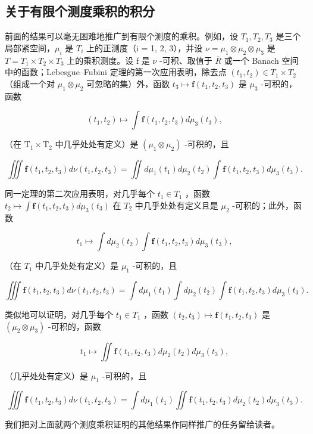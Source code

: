 \subsection{关于有限个测度乘积的积分}

前面的结果可以毫无困难地推广到有限个测度的乘积。例如，设 \(T_{1}, T_{2}, T_{3}\) 是三个局部紧空间，\(\mu_{i}\) 是 \(T_{i}\) 上的正测度（i = 1, 2, 3），并设 \(\nu = \mu_{1} \otimes \mu_{2} \otimes \mu_{3}\) 是 \(T = T_{1} \times T_{2} \times T_{3}\) 上的乘积测度。设 f 是 \(\nu\) -可积、取值于 \(\overline{R}\) 或一个 Banach 空间中的函数；Lebesgue--Fubini 定理的第一次应用表明，除去点 \((t_{1}, t_{2}) \in T_{1} \times T_{2}\) （组成一个对 \(\mu_{1} \otimes \mu_{2}\) 可忽略的集）外，函数 \(t_{3} \mapsto \mathbf{f}(t_{1}, t_{2}, t_{3})\) 是 \(\mu_{3}\) -可积的，函数

\[
(t _ {1}, t _ {2}) \mapsto \int \mathbf {f} (t _ {1}, t _ {2}, t _ {3}) d \mu_ {3} (t _ {3}),
\]

（在 \(\mathrm{T}_1\times \mathrm{T}_2\) 中几乎处处有定义）是 \((\mu_{1}\otimes \mu_{2})\) -可积的，且

\[
\iiint \mathbf {f} (t _ {1}, t _ {2}, t _ {3}) d \nu (t _ {1}, t _ {2}, t _ {3}) = \iint d \mu_ {1} (t _ {1}) d \mu_ {2} (t _ {2}) \int \mathbf {f} (t _ {1}, t _ {2}, t _ {3}) d \mu_ {3} (t _ {3}).
\]

同一定理的第二次应用表明，对几乎每个 \(t_{1} \in T_{1}\) ，函数 \(t_{2} \mapsto \int \mathbf{f}(t_{1}, t_{2}, t_{3}) d\mu_{3}(t_{3})\) 在 \(T_{2}\) 中几乎处处有定义且是 \(\mu_{2}\) -可积的；此外，函数

\[
t _ {1} \mapsto \int d \mu_ {2} (t _ {2}) \int \mathbf {f} (t _ {1}, t _ {2}, t _ {3}) d \mu_ {3} (t _ {3}),
\]

（在 \(T_{1}\) 中几乎处处有定义）是 \(\mu_{1}\) -可积的，且

\[
\iiint \mathbf {f} (t _ {1}, t _ {2}, t _ {3}) d \nu (t _ {1}, t _ {2}, t _ {3}) = \int d \mu_ {1} (t _ {1}) \int d \mu_ {2} (t _ {2}) \int \mathbf {f} (t _ {1}, t _ {2}, t _ {3}) d \mu_ {3} (t _ {3}).
\]

类似地可以证明，对几乎每个 \(t_{1} \in T_{1}\) ，函数 \((t_{2}, t_{3}) \mapsto \mathbf{f}(t_{1}, t_{2}, t_{3})\) 是 \((\mu_{2} \otimes \mu_{3})\) -可积的，函数

\[
t _ {1} \mapsto \iint \mathbf {f} (t _ {1}, t _ {2}, t _ {3}) d \mu_ {2} (t _ {2}) d \mu_ {3} (t _ {3}),
\]

（几乎处处有定义）是 \(\mu_{1}\) -可积的，且

\[
\iiint \mathbf {f} (t _ {1}, t _ {2}, t _ {3}) d \nu (t _ {1}, t _ {2}, t _ {3}) = \int d \mu_ {1} (t _ {1}) \iint \mathbf {f} (t _ {1}, t _ {2}, t _ {3}) d \mu_ {2} (t _ {2}) d \mu_ {3} (t _ {3}).
\]

我们把对上面就两个测度乘积证明的其他结果作同样推广的任务留给读者。

